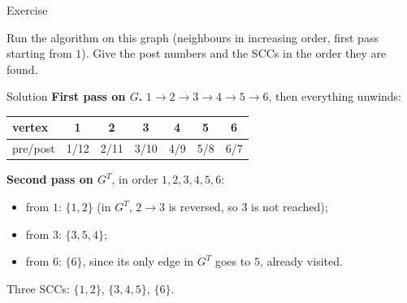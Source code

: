 \documentclass[10pt,aspectratio=169]{beamer}
\begin{document}
\begin{frame}{Exercise}
  \begin{center}
    Run the algorithm on this graph (neighbours in increasing order, first
    pass starting from $1$). Give the post numbers and the SCCs in the order
    they are found.
  \end{center}

  \bigskip
  \begin{center}
  \end{center}
\end{frame}

\begin{frame}{Solution}
  \textbf{First pass on $G$.} $1 \to 2 \to 3 \to 4 \to 5 \to 6$, then
  everything unwinds:
  \begin{center}
  \begin{tabular}{lcccccc}
    \toprule
    vertex & 1 & 2 & 3 & 4 & 5 & 6 \\
    \midrule
    pre/post & 1/12 & 2/11 & 3/10 & 4/9 & 5/8 & 6/7 \\
    \bottomrule
  \end{tabular}
  \end{center}

  \pause
  \bigskip
  \textbf{Second pass on $G^T$}, in order $1, 2, 3, 4, 5, 6$:
  \begin{itemize}
    \item from $1$: $\{1, 2\}$ (in $G^T$, $2 \to 3$ is reversed, so $3$ is
          not reached);
    \item from $3$: $\{3, 5, 4\}$;
    \item from $6$: $\{6\}$, since its only edge in $G^T$ goes to $5$, already
          visited.
  \end{itemize}

  \bigskip
  \begin{center}
    Three SCCs: $\{1,2\}$, $\{3,4,5\}$, $\{6\}$.
  \end{center}
\end{frame}
\end{document}
